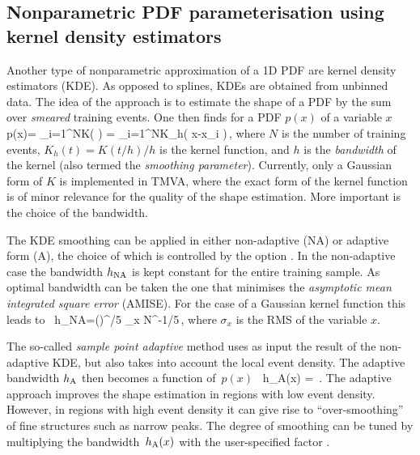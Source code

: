\subsection{Nonparametric PDF parameterisation using kernel density estimators
                }

Another type of nonparametric approximation of a 1D PDF are kernel density
estimators (KDE). As opposed to splines, KDEs are obtained from unbinned data. The idea 
of the approach is to estimate the shape of a PDF by the sum over {\em smeared} 
training events. One then finds for a PDF $p(x)$ of a variable $x$~\cite{scott}
%
\beq
\label{eq:PDF:KDEf0}
   p(x)= \sum_{i=1}^{N}K\!\left(  \right)
       = \sum_{i=1}^{N}K_h\!\left( x-x_i \right)\,,
\eeq
%
where $N$ is the number of training events, $K_h(t)=K(t/h)/h$ is the kernel 
function, and $h$ is the {\em bandwidth} of the kernel (also termed the {\em smoothing 
parameter}). Currently, only a Gaussian form of $K$ is implemented in TMVA, where the 
exact form of the kernel function is of minor relevance for the quality of the shape 
estimation. More important is the choice of the bandwidth. 

The KDE smoothing can be applied in either non-adaptive (NA) or adaptive form (A), 
the choice of which is controlled by the option . In the 
non-adaptive case the bandwidth $h_{\rm NA}$ is kept constant for the entire training sample. 
As optimal bandwidth can be taken the one that minimises the {\em asymptotic mean integrated 
square error} (AMISE). For the case of a Gaussian kernel function this leads to~\cite{scott}
%
\beq
   h_{\rm NA}=\left(\right)^{\!\!/5} \!\!\!\sigma_x N^{-1/5}\,,
\eeq
%
where $\sigma_x$ is the RMS of the variable $x$.

The so-called {\em sample point adaptive} method uses as input the result of the non-adaptive 
KDE, but also takes into account the local event density. The adaptive bandwidth $h_{\rm A}$
then becomes a function of~$p(x)$~\cite{scott}
%
\beq
\label{eq:PDF:KDEhx}
   h_{\rm A}(x) = \,.
\eeq
%
The adaptive approach improves the shape estimation in regions with low event density. However, in regions with high event density it can give rise to ``over-smoothing'' of fine 
structures such as narrow peaks. The degree of smoothing can be tuned by multiplying the 
bandwidth~$h_{\rm A}(x)$ with the user-specified factor . 

